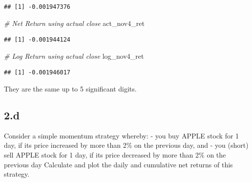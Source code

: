 \documentclass[
  oneside]{book}
\newenvironment{Shaded}{\begin{snugshade}}{\end{snugshade}}
\newcommand{\CommentTok}[1]{\textcolor[rgb]{0.56,0.35,0.01}{\textit{#1}}}
\newcommand{\NormalTok}[1]{#1}
\begin{document}
\begin{verbatim}
## [1] -0.001947376
\end{verbatim}

\begin{Shaded}
\begin{Highlighting}[]
\CommentTok{\# Net Return using actual close}
\NormalTok{act\_nov4\_ret}
\end{Highlighting}
\end{Shaded}

\begin{verbatim}
## [1] -0.001944124
\end{verbatim}

\begin{Shaded}
\begin{Highlighting}[]
\CommentTok{\# Log Return using actual close}
\NormalTok{log\_nov4\_ret}
\end{Highlighting}
\end{Shaded}

\begin{verbatim}
## [1] -0.001946017
\end{verbatim}

They are the same up to 5 significant digits.

\hypertarget{d}{%
\subsection{2.d}\label{d}}

Consider a simple momentum strategy whereby:
- you buy APPLE stock for 1 day, if its price increased by more than 2\% on the previous day, and
- you (short) sell APPLE stock for 1 day, if its price decreased by more than 2\% on the previous day
Calculate and plot the daily and cumulative net returns of this strategy.
\end{document}
